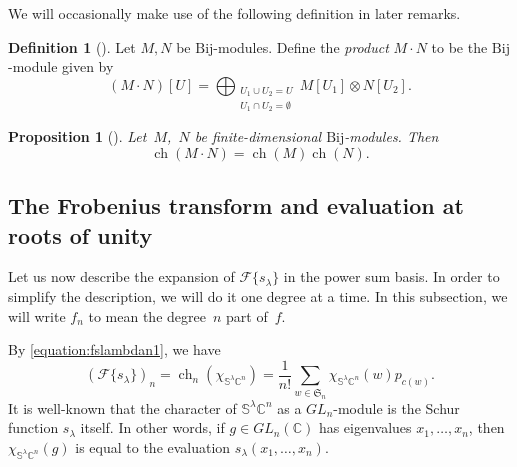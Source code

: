 \documentclass[11pt]{article}
\newtheorem{prop}[theo]{Proposition}
\theoremstyle{definition}
\newtheorem{defi}[theo]{Definition}
\numberwithin{equation}{section}
\newcommand{\K}{\mathbb{C}}
\newcommand{\rmBij}{\mathrm{Bij}}
\newcommand{\F}[1]{\mathscr{F}\{#1\}}
\newcommand{\Sym}{\mathfrak{S}}
\DeclareMathOperator{\ch}{ch}
\begin{document}
We will occasionally make use of the following definition in later remarks.
\begin{defi}[{\cite[Section~4.1]{MR0927763}}]\label{definition:speciesproduct}
    Let $M, N$ be $\rmBij$-modules. Define the \emph{product} $M \cdot N$ to be the $\rmBij$-module given by \[(M \cdot N)[U] = \bigoplus_{\substack{U_1 \cup U_2 = U \\ U_1 \cap U_2 = \emptyset}} M[U_1] \otimes N[U_2].\]
\end{defi}
\begin{prop}[{\cite[Proposition~2.1]{MR1132426}}]
    \label{proposition:moduleproduct}
    Let~$M$,~$N$ be finite-dimensional $\rmBij$-modules. Then \[\ch(M \cdot N) = \ch(M) \ch(N).\]
\end{prop}
\subsection{The Frobenius transform and evaluation at roots of unity}\label{subsection:rootsofunity}
Let us now describe the expansion of $\F{s_\lambda}$ in the power sum basis. In order to simplify the description, we will do it one degree at a time. In this subsection, we will write $f_n$ to mean the degree~$n$ part of~$f$.

By \eqref{equation:fslambdan1}, we have
\begin{equation}\label{equation:fslambdan2}
(\F{s_\lambda})_n = \ch_n(\chi_{\mathbb{S}^\lambda \K^n}) = \frac{1}{n!} \sum_{w \in \Sym_n} \chi_{\mathbb{S}^\lambda \K^n}(w) p_{c(w)}.
\end{equation}
It is well-known \cite[Section~8.3]{MR1464693} that the character of $\mathbb{S}^\lambda \K^n$ as a $GL_n$-module is the Schur function $s_\lambda$ itself. In other words, if $g \in GL_n(\K)$ has eigenvalues $x_1, \ldots, x_n$, then $\chi_{\mathbb{S}^\lambda \K^n}(g)$ is equal to the evaluation $s_\lambda(x_1, \ldots, x_n)$.
\end{document}
